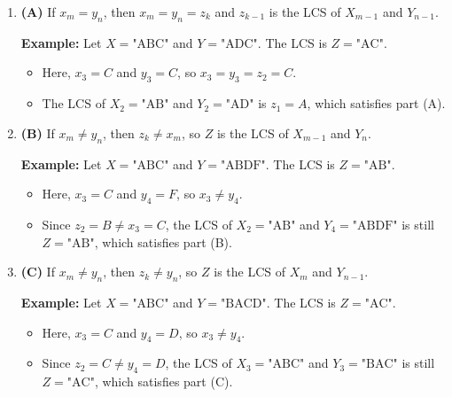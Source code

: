 \begin{intuition}
    \begin{enumerate}
        \item \textbf{(A)} If $x_m = y_n$, then $x_m = y_n = z_k$ and $z_{k-1}$ is the LCS of $X_{m-1}$ and $Y_{n-1}$.
        
        \textbf{Example:} Let $X = \text{"ABC"}$ and $Y = \text{"ADC"}$. The LCS is $Z = \text{"AC"}$.
        \begin{itemize}
            \item Here, $x_3 = C$ and $y_3 = C$, so $x_3 = y_3 = z_2 = C$.
            \item The LCS of $X_2 = \text{"AB"}$ and $Y_2 = \text{"AD"}$ is $z_1 = A$, which satisfies part (A).
        \end{itemize}
        
        \item \textbf{(B)} If $x_m \neq y_n$, then $z_k \neq x_m$, so $Z$ is the LCS of $X_{m-1}$ and $Y_n$.
        
        \textbf{Example:} Let $X = \text{"ABC"}$ and $Y = \text{"ABDF"}$. The LCS is $Z = \text{"AB"}$.
        \begin{itemize}
            \item Here, $x_3 = C$ and $y_4 = F$, so $x_3 \neq y_4$.
            \item Since $z_2 = B \neq x_3 = C$, the LCS of $X_2 = \text{"AB"}$ and $Y_4 = \text{"ABDF"}$ is still $Z = \text{"AB"}$, which satisfies part (B).
        \end{itemize}
        
        \item \textbf{(C)} If $x_m \neq y_n$, then $z_k \neq y_n$, so $Z$ is the LCS of $X_m$ and $Y_{n-1}$.
        
        \textbf{Example:} Let $X = \text{"ABC"}$ and $Y = \text{"BACD"}$. The LCS is $Z = \text{"AC"}$.
        \begin{itemize}
            \item Here, $x_3 = C$ and $y_4 = D$, so $x_3 \neq y_4$.
            \item Since $z_2 = C \neq y_4 = D$, the LCS of $X_3 = \text{"ABC"}$ and $Y_3 = \text{"BAC"}$ is still $Z = \text{"AC"}$, which satisfies part (C).
        \end{itemize}
    \end{enumerate}
\end{intuition}

